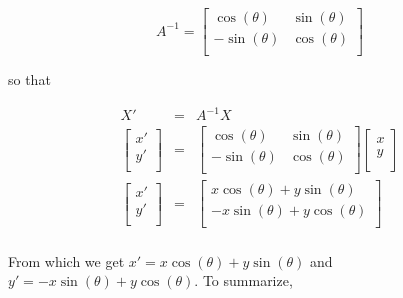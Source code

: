 \documentclass{ximera}
\begin{document}
\vspace{-.05in}

\[ A^{-1} = \left[ \begin{array}{rr} \cos(\theta) & \sin(\theta) \\ -\sin(\theta) & \cos(\theta) \\ \end{array} \right] \]

so that

\[ \begin{array}{rcl}

X'& = & A^{-1} X \\ [5pt]
\left[ \begin{array}{c}x' \\ y'\\ \end{array} \right] & = & \left[ \begin{array}{rr} \cos(\theta) & \sin(\theta) \\ -\sin(\theta) & \cos(\theta) \\ \end{array} \right]\left[ \begin{array}{c}x \\ y\\ \end{array} \right] \\ [15pt]

\left[ \begin{array}{c}x' \\ y'\\ \end{array} \right] & = & \left[ \begin{array}{c}x \cos(\theta) + y\sin(\theta) \\- x \sin(\theta) + y\cos(\theta)  \\ \end{array} \right] \\ \end{array} \]

From which we get $x' = x \cos(\theta) + y\sin(\theta)$ and $y'=- x \sin(\theta) + y\cos(\theta)$.   To summarize, 

\medskip
\end{document}

